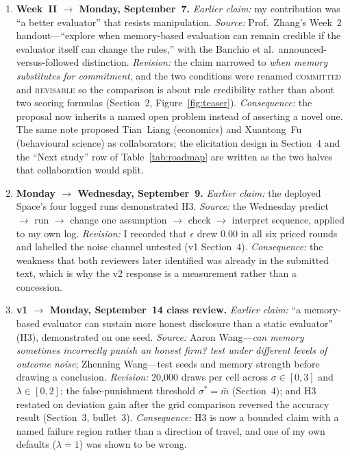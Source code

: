 \begin{enumerate}
\item \textbf{Week~II $\to$ Monday, September~7.}
\emph{Earlier claim:} my contribution was ``a better evaluator'' that resists
manipulation.
\emph{Source:} Prof.\ Zhang's Week~2 handout---``explore when memory-based
evaluation can remain credible if the evaluator itself can change the rules,''
with the Banchio et al.\ announced-versus-followed distinction.
\emph{Revision:} the claim narrowed to \emph{when memory substitutes for
commitment}, and the two conditions were renamed \textsc{committed} and
\textsc{revisable} so the comparison is about rule credibility rather than about
two scoring formulas (Section~2, Figure~\ref{fig:teaser}).
\emph{Consequence:} the proposal now inherits a named open problem instead of
asserting a novel one. The same note proposed Tian~Liang (economics) and
Xuantong~Fu (behavioural science) as collaborators; the elicitation design in
Section~4 and the ``Next study'' row of Table~\ref{tab:roadmap} are written as
the two halves that collaboration would split.

\item \textbf{Monday $\to$ Wednesday, September~9.}
\emph{Earlier claim:} the deployed Space's four logged runs demonstrated H3.
\emph{Source:} the Wednesday predict $\to$ run $\to$ change one assumption
$\to$ check $\to$ interpret sequence, applied to my own log.
\emph{Revision:} I recorded that $\epsilon$ drew $0.00$ in all six priced rounds
and labelled the noise channel untested (v1 Section~4).
\emph{Consequence:} the weakness that both reviewers later identified was
already in the submitted text, which is why the v2 response is a measurement
rather than a concession.

\item \textbf{v1 $\to$ Monday, September~14 class review.}
\emph{Earlier claim:} ``a memory-based evaluator can sustain more honest
disclosure than a static evaluator'' (H3), demonstrated on one seed.
\emph{Source:} Aaron Wang---\emph{can memory sometimes incorrectly punish an
honest firm? test under different levels of outcome noise}; Zhenning Wang---test
seeds and memory strength before drawing a conclusion.
\emph{Revision:} 20{,}000 draws per cell across $\sigma\in[0,3]$ and
$\lambda\in[0,2]$; the false-punishment threshold $\sigma^{*}=\bar m$
(Section~4); and H3 restated on deviation gain after the grid comparison
reversed the accuracy result (Section~3, bullet~3).
\emph{Consequence:} H3 is now a bounded claim with a named failure region rather
than a direction of travel, and one of my own defaults ($\lambda=1$) was shown
to be wrong.
\end{enumerate}


